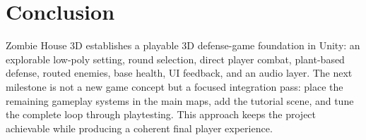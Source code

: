 \section{Conclusion}

Zombie House 3D establishes a playable 3D defense-game foundation in Unity: an explorable low-poly setting, round selection, direct player combat, plant-based defense, routed enemies, base health, UI feedback, and an audio layer. The next milestone is not a new game concept but a focused integration pass: place the remaining gameplay systems in the main maps, add the tutorial scene, and tune the complete loop through playtesting. This approach keeps the project achievable while producing a coherent final player experience.

